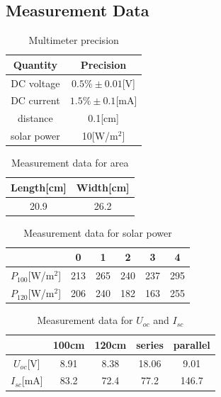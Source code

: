 \documentclass[12pt]{article}
\begin{document}
\subsection{Measurement Data}
\begin{table}[H]
\centering
\begin{tabular}{|c|c|}
\hline
Quantity    & Precision \\ \hline
DC voltage  & $0.5\%\pm0.01$[V]       \\ \hline
DC current  & $1.5\%\pm0.1$[mA]   
    \\ \hline
distance    & 0.1[cm]       \\ \hline
solar power & 10[W/m$^2$]        \\ \hline
\end{tabular}
\caption{Multimeter precision}
\end{table}
\begin{table}[H]
\centering
\begin{tabular}{|c|c|}
\hline
Length[cm] & Width[cm] \\ \hline
20.9       & 26.2      \\ \hline
\end{tabular}
\caption{Measurement data for area}
\end{table}
\begin{table}[H]
\centering
\begin{tabular}{|c|c|c|c|c|c|}
\hline
 & 0   & 1   & 2   & 3   & 4   \\ \hline
$P_{100}$[W/m$^2$] & 213 & 265 & 240 & 237 & 295 \\ \hline
$P_{120}$[W/m$^2$] & 206 & 240 & 182 & 163 & 255 \\ \hline
\end{tabular}
\caption{Measurement data for solar power}
\end{table}
\begin{table}[H]
\centering
\begin{tabular}{|c|c|c|c|c|}
\hline
 & 100cm & 120cm & series & parallel \\ \hline
$U_{oc}$[V] & 8.91  & 8.38  & 18.06  & 9.01     \\ \hline
$I_{sc}$[mA] & 83.2  & 72.4  & 77.2   & 146.7    \\ \hline
\end{tabular}
\caption{Measurement data for $U_{oc}$ and $I_{sc}$}
\end{table}
\end{document}
